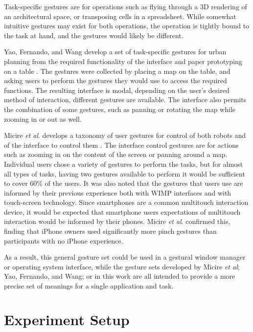 \documentclass[]{article}
\begin{document}
Task-specific gestures are for operations such as flying through a 3D rendering of an architectural space, or transposing cells in a spreadsheet. 
While somewhat intuitive gestures may exist for both operations, the operation is tightly bound to the task at hand, and the gestures would likely be different. 

Yao, Fernando, and Wang develop a set of task-specific gestures for urban planning from the required functionality of the interface and paper prototyping on a table \cite{yao2012multi}. 
The gestures were collected by placing a map on the table, and asking users to perform the gestures they would use to access the required functions. 
The resulting interface is modal, depending on the user's desired method of interaction, different gestures are available. 
The interface also permits the combination of some gestures, such as panning or rotating the map while zooming in or out as well. 

Micire \textit{et al}. develops a taxonomy of user gestures for control of both robots and of the interface to control them \cite{Micire:2009:ANG:1731903.1731912}. 
The interface control gestures are for actions such as zooming in on the content of the screen or panning around a map. 
Individual users chose a variety of gestures to perform the tasks, but for almost all types of tasks, having two gestures available to perform it would be sufficient to cover 60\% of the users. 
It was also noted that the gestures that users use are informed by their previous experience both with WIMP interfaces and with touch-screen technology. 
Since smartphones are a common multitouch interaction device, it would be expected that smartphone users expectations of multitouch interaction would be informed by their phones. 
Micire \textit{et al}. confirmed this, finding that iPhone owners used significantly more pinch gestures than participants with no iPhone experience. 
 
As a result, this general gesture set could be used in a gestural window manager or operating system interface, while the gesture sets developed by Micire \textit{et al}; Yao, Fernando, and Wang; or in this work are all intended to provide a more precise set of meanings for a single application and task. 

\section{Experiment Setup}

\end{document}
